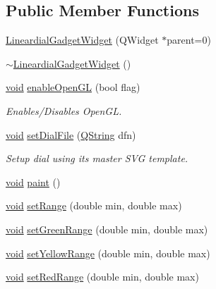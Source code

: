 \subsection*{\-Public \-Member \-Functions}
\begin{DoxyCompactItemize}
\item 
\hyperlink{group___linear_dial_plugin_ga67af774f5fa476bda0dce880d57348a7}{\-Lineardial\-Gadget\-Widget} (\-Q\-Widget $\ast$parent=0)
\item 
\hyperlink{group___linear_dial_plugin_ga46b2275fc21a5a5fc14809f31be48674}{$\sim$\-Lineardial\-Gadget\-Widget} ()
\item 
\hyperlink{group___u_a_v_objects_plugin_ga444cf2ff3f0ecbe028adce838d373f5c}{void} \hyperlink{group___linear_dial_plugin_ga6963a6b647b9d9def0497b60df89d576}{enable\-Open\-G\-L} (bool flag)
\begin{DoxyCompactList}\small\item\em \-Enables/\-Disables \-Open\-G\-L. \end{DoxyCompactList}\item 
\hyperlink{group___u_a_v_objects_plugin_ga444cf2ff3f0ecbe028adce838d373f5c}{void} \hyperlink{group___linear_dial_plugin_ga5242e6b2ecad5fb0d80b13f5e989c671}{set\-Dial\-File} (\hyperlink{group___u_a_v_objects_plugin_gab9d252f49c333c94a72f97ce3105a32d}{\-Q\-String} dfn)
\begin{DoxyCompactList}\small\item\em \-Setup dial using its master \-S\-V\-G template. \end{DoxyCompactList}\item 
\hyperlink{group___u_a_v_objects_plugin_ga444cf2ff3f0ecbe028adce838d373f5c}{void} \hyperlink{group___linear_dial_plugin_ga90222159d9de45fe9f4321c30e3f536a}{paint} ()
\item 
\hyperlink{group___u_a_v_objects_plugin_ga444cf2ff3f0ecbe028adce838d373f5c}{void} \hyperlink{group___linear_dial_plugin_ga659bce00c419425ed6e5e03095b06e3c}{set\-Range} (double min, double max)
\item 
\hyperlink{group___u_a_v_objects_plugin_ga444cf2ff3f0ecbe028adce838d373f5c}{void} \hyperlink{group___linear_dial_plugin_ga46b699d52d4dea2d6b6ff2b37a5657b0}{set\-Green\-Range} (double min, double max)
\item 
\hyperlink{group___u_a_v_objects_plugin_ga444cf2ff3f0ecbe028adce838d373f5c}{void} \hyperlink{group___linear_dial_plugin_ga109a0d550537110c81433ec36eaea6ba}{set\-Yellow\-Range} (double min, double max)
\item 
\hyperlink{group___u_a_v_objects_plugin_ga444cf2ff3f0ecbe028adce838d373f5c}{void} \hyperlink{group___linear_dial_plugin_gac43bdb344ff4fa3376e0c38358b9ae22}{set\-Red\-Range} (double min, double max)

\end{DoxyCompactItemize}
